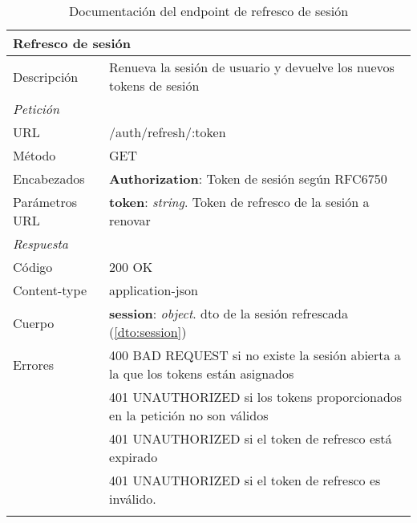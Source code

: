 \begin{longtable}{|p{} p{}|}
    \hline
    \multicolumn{2}{|l|}{\textbf{Refresco de sesión}} \\ \hline 
    Descripción         & Renueva la sesión de usuario y devuelve los nuevos tokens de sesión \\ \hline \hline
    \multicolumn{2}{|l|}{\emph{Petición}}  \\ \hline 
    URL      & /auth/refresh/:token \\ \hline
    Método   & GET                  \\ \hline
    Encabezados  & 
    \textbf{Authorization}: Token de sesión según RFC6750 \\ \hline
    Parámetros URL  & 
    \textbf{token}: \emph{string}. Token de refresco de la sesión a renovar \\ \hline \hline
    \multicolumn{2}{|l|}{\emph{Respuesta}} \\ \hline 
    Código          & 200 OK          \\ \hline
    Content-type    & application-json  \\ \hline
    Cuerpo  & 
    \textbf{session}: \emph{object}. \acrshort{dto} de la sesión refrescada (\ref{dto:session}) \\ \hline \hline
    Errores & 400 BAD REQUEST si no existe la sesión abierta a la que los tokens están asignados \\     
        & 401 UNAUTHORIZED si los tokens proporcionados en la petición no son válidos \\
        & 401 UNAUTHORIZED si el token de refresco está expirado \\
        & 401 UNAUTHORIZED si el token de refresco es inválido.
    \\ \hline
    \caption{Documentación del endpoint de refresco de sesión}
    \label{api:refresco_sesion}
\end{longtable}
